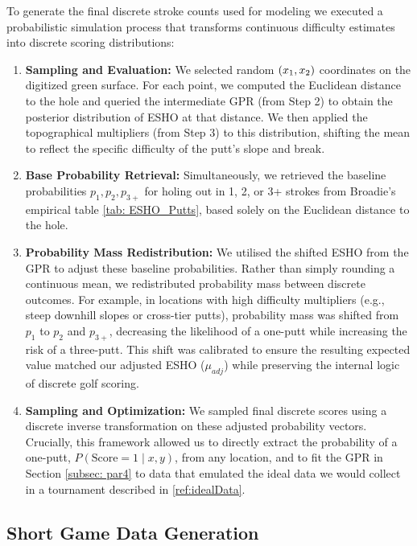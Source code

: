 \documentclass[11pt, letterpaper]{article}
\begin{document}
\begin{enumerate}
To generate the final discrete stroke counts used for modeling we executed a probabilistic simulation process that transforms continuous difficulty estimates into discrete scoring distributions:
\begin{enumerate}
    \item \textbf{Sampling and Evaluation:} We selected random $(x_1, x_2)$ coordinates on the digitized green surface. For each point, we computed the Euclidean distance to the hole and queried the intermediate GPR (from Step 2) to obtain the posterior distribution of ESHO at that distance. We then applied the topographical multipliers (from Step 3) to this distribution, shifting the mean to reflect the specific difficulty of the putt's slope and break.

    \item \textbf{Base Probability Retrieval:} Simultaneously, we retrieved the baseline probabilities $p_1, p_2, p_{3+}$ for holing out in 1, 2, or 3+ strokes from Broadie's empirical table \ref{tab: ESHO_Putts}, based solely on the Euclidean distance to the hole.

    \item \textbf{Probability Mass Redistribution:} We utilised the shifted ESHO from the GPR to adjust these baseline probabilities. Rather than simply rounding a continuous mean, we redistributed probability mass between discrete outcomes. For example, in locations with high difficulty multipliers (e.g., steep downhill slopes or cross-tier putts), probability mass was shifted from $p_1$ to $p_2$ and $p_{3+}$, decreasing the likelihood of a one-putt while increasing the risk of a three-putt. This shift was calibrated to ensure the resulting expected value matched our adjusted ESHO ($\mu_{adj}$) while preserving the internal logic of discrete golf scoring.

    \item \textbf{Sampling and Optimization:} We sampled final discrete scores using a discrete inverse transformation on these adjusted probability vectors. Crucially, this framework allowed us to directly extract the probability of a one-putt, $P(\text{Score}=1 \mid x, y)$, from any location, and to fit the GPR in Section \ref{subsec: par4} to data that emulated the ideal data we would collect in a tournament described in \ref{ref:idealData}. 
\end{enumerate}
\end{enumerate}

\subsection{Short Game Data Generation}
\label{app: short-game data}
\end{document}
